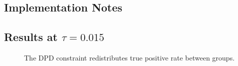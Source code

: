 \documentclass[11pt]{article}
\begin{document}
\subsection{Implementation Notes}

\subsection{Results at \texorpdfstring{$\tau = 0.015$}{tau = 0.015}}\label{sec:singletolerance}

\begin{figure}[H]
\caption{The DPD constraint redistributes true positive rate between groups.}
\label{fig:act3_pergroup}
\end{figure}
\end{document}

